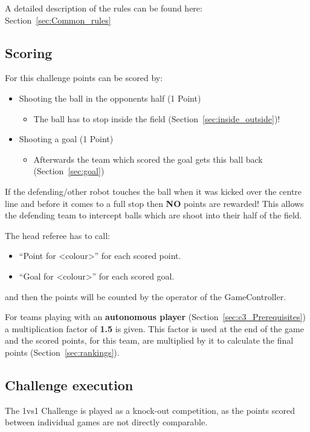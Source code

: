 A detailed description of the rules can be found here: Section~\ref{sec:Common_rules}

\subsection{Scoring}
\label{sec:scoring}

For this challenge points can be scored by:
\begin{itemize}
	\item Shooting the ball in the opponents half (1 Point)
	\begin{itemize}
		\item The ball has to stop inside the field (\cf Section~\ref{sec:inside_outside})!
	\end{itemize} 
	\item Shooting a goal (1 Point)
	\begin{itemize}
		\item Afterwards the team which scored the goal gets this ball back (\cf Section~\ref{sec:goal})
	\end{itemize}
\end{itemize}

If the defending/other robot touches the ball when it was kicked over the centre line and before it comes to a full stop then \textbf{NO} points are rewarded! This allows the defending team to intercept balls which are shoot into their half of the field.

The head referee has to call:
\begin{itemize}
	\item ``Point for \textless colour\textgreater'' for each scored point.
	\item ``Goal for \textless colour\textgreater'' for each scored goal.
\end{itemize}
and then the points will be counted by the operator of the GameController.

For teams playing with an \textbf{autonomous player} (\cf Section~\ref{sec:c3_Prerequisites}) a multiplication factor of \textbf{1.5} is given. This factor is used at the end of the game and the scored points, for this team, are multiplied by it to calculate the final points (\cf Section~\ref{sec:rankings}). 

\subsection{Challenge execution}
The 1vs1 Challenge is played as a knock-out competition, as the points scored between individual games are not directly comparable. 

